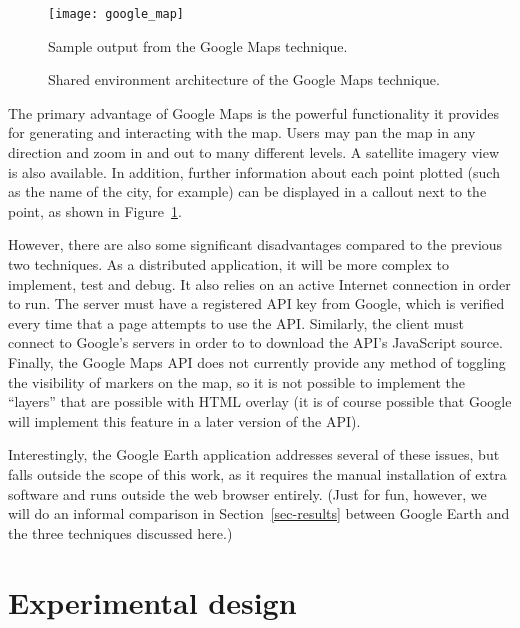 \documentclass[acmtocl,acmnow]{acmtrans2m}
\begin{document}
\begin{figure}
	\begin{center}
		\texttt{[image: google\_map]}
	\end{center}
	\caption{Sample output from the Google Maps technique.}
	\label{fig-google}
\end{figure}


\begin{figure}
	\caption{Shared environment architecture of the Google Maps
	technique.}
	\label{fig-google-architecture}
\end{figure}


The primary advantage of Google Maps is the powerful functionality it
provides for generating and interacting with the map. Users may pan the
map in any direction and zoom in and out to many different levels. A
satellite imagery view is also available. In addition, further
information about each point plotted (such as the name of the city, for
example) can be displayed in a callout next to the point, as shown in
Figure~\ref{fig-google}.

However, there are also some significant disadvantages compared to the
previous two techniques. As a distributed application, it will be more
complex to implement, test and debug. It also relies on an active
Internet connection in order to run. The server must have a registered
API key from Google, which is verified every time that a page attempts
to use the API. Similarly, the client must connect to Google's servers
in order to to download the API's JavaScript source. Finally, the Google
Maps API does not currently provide any method of toggling the
visibility of markers on the map, so it is not possible to implement the
``layers'' that are possible with HTML overlay (it is of course possible
that Google will implement this feature in a later version of the API).

Interestingly, the Google Earth application addresses several of these
issues, but falls outside the scope of this work, as it requires the
manual installation of extra software and runs outside the web browser
entirely. (Just for fun, however, we will do an informal comparison in
Section~\ref{sec-results} between Google Earth and the three techniques
discussed here.)


\section{Experimental design}
\label{sec-experiment}
\end{document}
